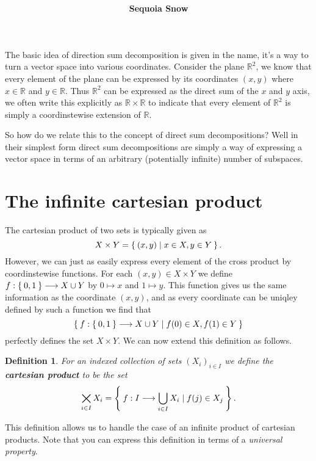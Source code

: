 \documentclass[12pt]{extarticle}
\title{
\textmd{\textbf{\articletile}}\\
}
\author{\textbf{Sequoia Snow}}
\date{}
\newtheorem{definition}[theorem]{Definition}
\renewcommand{\mapsto}[0]{\longmapsto}
\renewcommand{\to}[0]{\longrightarrow}
\newcommand{\R}{{\mathbb{R}}}
\begin{document}
\maketitle

The basic idea of direction sum decomposition is given in the name, it's a way to turn a vector space into various coordinates. Consider the plane $\mathbb{R}^2$, we know that every element of the plane can be expressed by its coordinates $(x,y)$ where $x \in \R$ and $y \in \R$. Thus $\R^2$ can be expressed as the direct sum of the $x$ and $y$ axis, we often write this explicitly as $\R \times \R$ to indicate that every element of $\R^2$ is simply a coordinstewise extension of $\R$. 

So how do we relate this to the concept of direct sum decompositions? Well in their simplest form direct sum decompositions are simply a way of expressing a vector space in terms of an arbitrary (potentially infinite) number of subspaces. 

\section{The infinite cartesian product} 

The cartesian product of two sets is typically given as 
\[
  X \times Y = \Set{ (x,y) \mid x \in X, y \in Y}.
\]
However, we can just as easily express every element of the cross product by coordinstewise functions. For each $(x, y) \in X \times Y$ we define $f : \Set{0,1} \to X \cup Y$ by $0 \mapsto x$ and $1 \mapsto y$. This function gives us the same information as the coordinate $(x,y)$, and as every coordinate can be uniqley defined by such a function we find that 
\[
  \Set{ f : \Set{0,1} \to X \cup Y \mid f(0) \in X, f(1) \in Y}
\]
perfectly defines the set $X \times Y$. We can now extend this definition as follows.

\begin{definition}
  For an indexed collection of sets $(X_i)_{i \in I}$ we define the \textbf{cartesian product} to be the set 
  \[
    \bigtimes_{i \in I} X_i = \Set{ f : I \to \bigcup_{i \in I} X_i \mid f(j) \in X_j }. 
  \]
\end{definition}

This definition allows us to handle the case of an infinite product of cartesian products. Note that you can express this definition in terms of a \textit{universal property}. 
\end{document}
